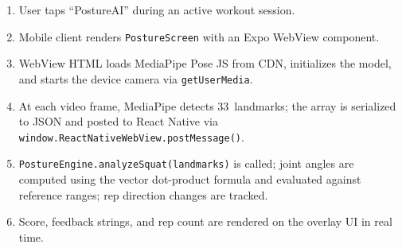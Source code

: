 \begin{enumerate}[noitemsep]
	\item User taps ``PostureAI'' during an active workout session.
	\item Mobile client renders \texttt{PostureScreen} with an Expo
	WebView component.
	\item WebView HTML loads MediaPipe Pose JS from CDN, initializes the
	model, and starts the device camera via \texttt{getUserMedia}.
	\item At each video frame, MediaPipe detects 33~landmarks; the array
	is serialized to JSON and posted to React Native via
	\texttt{window.ReactNativeWebView.postMessage()}.
	\item \texttt{PostureEngine.analyzeSquat(landmarks)} is called; joint
	angles are computed using the vector dot-product formula and
	evaluated against reference ranges; rep direction changes are
	tracked.
	\item Score, feedback strings, and rep count are rendered on the
	overlay UI in real time.
\end{enumerate}

